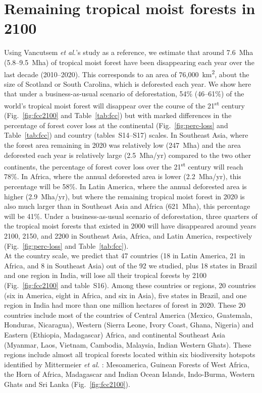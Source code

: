 \documentclass[
  12pt,
]{article}
\begin{document}
\hypertarget{remaining-tropical-moist-forests-in-2100}{%
\section{Remaining tropical moist forests in 2100}\label{remaining-tropical-moist-forests-in-2100}}

Using Vancutsem \emph{et al.}'s study \citep{Vancutsem2021} as a reference, we estimate that around 7.6~Mha (5.8--9.5~Mha) of tropical moist forest have been disappearing each year over the last decade (2010--2020). This corresponds to an area of 76,000~km\textsuperscript{2}, about the size of Scotland or South Carolina, which is deforested each year. We show here that under a business-as-usual scenario of deforestation, 54\% (46--61\%) of the world's tropical moist forest will disappear over the course of the 21\textsuperscript{st} century (Fig.~\ref{fig:fcc2100} and Table~\ref{tab:fcc}) but with marked differences in the percentage of forest cover loss at the continental (Fig.~\ref{fig:perc-loss} and Table~\ref{tab:fcc}) and country (tables~S14--S17) scales. In Southeast Asia, where the forest area remaining in 2020 was relatively low (247~Mha) and the area deforested each year is relatively large (2.5~Mha/yr) compared to the two other continents, the percentage of forest cover loss over the 21\textsuperscript{st} century will reach 78\%. In Africa, where the annual deforested area is lower (2.2~Mha/yr), this percentage will be 58\%. In Latin America, where the annual deforested area is higher (2.9~Mha/yr), but where the remaining tropical moist forest in 2020 is also much larger than in Southeast Asia and Africa (621~Mha), this percentage will be 41\%. Under a business-as-usual scenario of deforestation, three quarters of the tropical moist forests that existed in 2000 will have disappeared around years 2100, 2150, and 2200 in Southeast Asia, Africa, and Latin America, respectively (Fig.~\ref{fig:perc-loss} and Table~\ref{tab:fcc}).\\

At the country scale, we predict that 47 countries (18 in Latin America, 21 in Africa, and 8 in Southeast Asia) out of the 92 we studied, plus 18 states in Brazil and one region in India, will lose all their tropical forests by 2100 (Fig.~\ref{fig:fcc2100} and table~S16). Among these countries or regions, 20 countries (six in America, eight in Africa, and six in Asia), five states in Brazil, and one region in India had more than one million hectares of forest in 2020. These 20 countries include most of the countries of Central America (Mexico, Guatemala, Honduras, Nicaragua), Western (Sierra Leone, Ivory Coast, Ghana, Nigeria) and Eastern (Ethiopia, Madagascar) Africa, and continental Southeast Asia (Myanmar, Laos, Vietnam, Cambodia, Malaysia, Indian Western Ghats). These regions include almost all tropical forests located within six biodiversity hotspots identified by Mittermeier \emph{et al.} \citep{Mittermeier2011}: Mesoamerica, Guinean Forests of West Africa, the Horn of Africa, Madagascar and Indian Ocean Islands, Indo-Burma, Western Ghats and Sri Lanka (Fig.~\ref{fig:fcc2100}).\\
\end{document}
